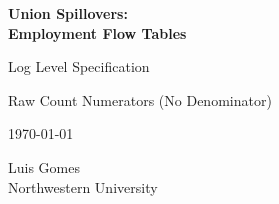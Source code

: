 \documentclass[12pt,letterpaper]{article}
\begin{document}
\begin{titlepage}
\centering
\vspace*{2cm}
{\Huge\bfseries Union Spillovers:\\Employment Flow Tables\par}
\vspace{2cm}
{\Large Log Level Specification\par}
\vspace{0.5cm}
{\large Raw Count Numerators (No Denominator)\par}
\vspace{1cm}
{\large \today\par}
\vfill
{\large Luis Gomes\\Northwestern University\par}
\end{titlepage}

\tableofcontents
\clearpage
\end{document}
